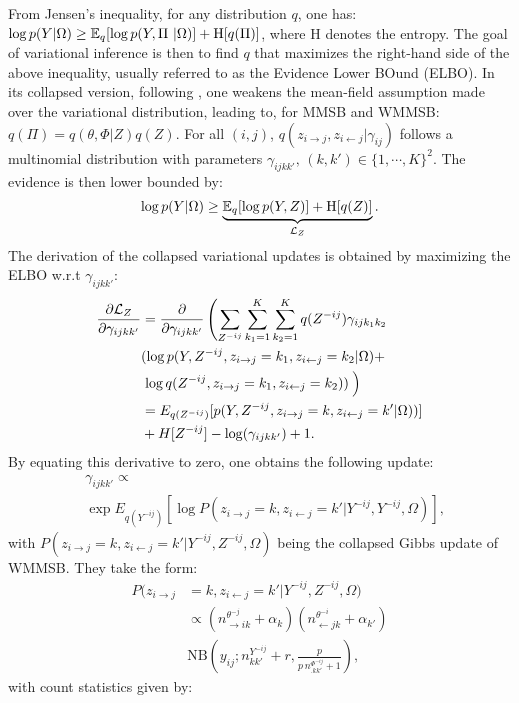 From Jensen's inequality, for any distribution $q$, one has: $\log p({Y} | \Omega) \ge \mathbb{E}_{q}[\log p({Y}, \Pi\ | \Omega)] + \textrm{H}[q(\Pi)]$,
where $\textrm{H}$ denotes the entropy. The goal of variational inference is then to find $q$ that maximizes the right-hand side of the above inequality, usually referred to as the Evidence Lower BOund (ELBO). In its collapsed version, following \cite{teh2007collapsed}, one weakens the mean-field assumption made over the variational distribution, leading to, for MMSB and WMMSB: $q(\Pi) = q(\theta, \Phi | Z) q(Z)$.
For all $(i,j)$, $q(z_{i \rightarrow j}, z_{i \leftarrow j}|\gamma_{ij})$ follows a multinomial distribution with parameters $\gamma_{ijkk'}, \, (k,k') \in \{1, \cdots, K\}^2$. The evidence is then lower bounded by:
%
\begin{equation*}
\log p({Y}|\Omega) \geq \underbrace{\mathbb{E}_{q}[\log p({Y}, Z)] + \textrm{H}[q(Z)]}_{\mathcal{L}_Z}.
\end{equation*}
%
The derivation of the collapsed variational updates is obtained by maximizing the ELBO w.r.t $\gamma_{ijkk'}$:
%
\begin{align*}
\frac{\partial \mathcal{L}_Z}{\partial \gamma_{ijkk'}} &= \frac{\partial }{\partial \gamma_{ijkk'}} \left( \sum_{{Z}^{-ij}}\sum_{k_1=1}^K\sum_{k_2=1}^K  q({Z}^{-ij}) \gamma_{ijk_1 k_2} \right. \\
& (\log p({Y}, {Z}^{-ij}, z_{i\rightarrow j}=k_1, z_{i\leftarrow j}=k_2|\Omega)+ \\
& \left. \log q({Z}^{-ij}, z_{i\rightarrow j}=k_1, z_{i\leftarrow j}=k_2) ) \frac{}{} \right) \\
& = E_{q({Z}^{-ij})}[ p({Y}, {Z}^{-ij}, z_{i\rightarrow j}=k, z_{i\leftarrow j}=k'|\Omega))] \\
& + H[{Z}^{-ij}] -\log(\gamma_{ijkk'}) +1.
\end{align*}
%
By equating this derivative to zero, one obtains the following update:
\begin{align} \label{eq:maximization}
&\gamma_{ijkk'} \propto \nonumber\\
&\exp E_{q({Y}^{-ij})} [\log P(z_{i\rightarrow j}=k, z_{i\leftarrow j}=k' | {Y}^{-ij}, {Y}^{-ij}, \Omega)],
\end{align}
%
with  $P(z_{i\rightarrow j}=k, z_{i\leftarrow j}=k' | {Y}^{-ij}, {Z}^{-ij}, \Omega)$ being the collapsed Gibbs update of WMMSB. They take the form:
%
\begin{align*}
P(z_{i\rightarrow j} & = k, z_{i\leftarrow j}=k' |{Y}^{-ij}, {Z}^{-ij}, \Omega) \\
& \propto (n_{\rightarrow ik}^{\theta^{-j}} + \alpha_k) (n_{\leftarrow jk}^{\theta^{-i}} + \alpha_{k'}) \\
& \mathrm{NB}\left(y_{ij}; n^{{Y}^{-ij}}_{kk'} + r, \frac{p}{p\,n^{\Phi^{-ij}}_{\bm{.}kk'} + 1} \right),
\end{align*}
%
with count statistics given by:


